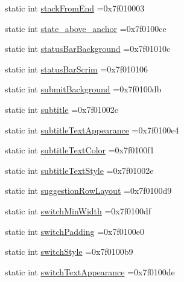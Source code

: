 \begin{DoxyCompactItemize}
static int \hyperlink{classandroid_1_1support_1_1graphics_1_1drawable_1_1R_1_1attr_a69b9d8cfb921bb4234e53faddca13058}{stack\+From\+End} =0x7f010003
\item 
static int \hyperlink{classandroid_1_1support_1_1graphics_1_1drawable_1_1R_1_1attr_af03faf6deb8ce110a4db717d7e23e2cd}{state\+\_\+above\+\_\+anchor} =0x7f0100ce
\item 
static int \hyperlink{classandroid_1_1support_1_1graphics_1_1drawable_1_1R_1_1attr_a003886c91c98b2d79fc47306239dae32}{status\+Bar\+Background} =0x7f01010c
\item 
static int \hyperlink{classandroid_1_1support_1_1graphics_1_1drawable_1_1R_1_1attr_ae9af0f0a3043093340539f6d883bf012}{status\+Bar\+Scrim} =0x7f010106
\item 
static int \hyperlink{classandroid_1_1support_1_1graphics_1_1drawable_1_1R_1_1attr_a516ee932c13db0421f20e1f2818077c0}{submit\+Background} =0x7f0100db
\item 
static int \hyperlink{classandroid_1_1support_1_1graphics_1_1drawable_1_1R_1_1attr_a24db67f2502f723666f0577dbff40bfb}{subtitle} =0x7f01002c
\item 
static int \hyperlink{classandroid_1_1support_1_1graphics_1_1drawable_1_1R_1_1attr_aaca2519d000a48ad7a1a510388e73ea3}{subtitle\+Text\+Appearance} =0x7f0100e4
\item 
static int \hyperlink{classandroid_1_1support_1_1graphics_1_1drawable_1_1R_1_1attr_a8f14fb74741e1aed62820e6a44ee49d7}{subtitle\+Text\+Color} =0x7f0100f1
\item 
static int \hyperlink{classandroid_1_1support_1_1graphics_1_1drawable_1_1R_1_1attr_af4b58eb0ee183d623b2f935f503dee78}{subtitle\+Text\+Style} =0x7f01002e
\item 
static int \hyperlink{classandroid_1_1support_1_1graphics_1_1drawable_1_1R_1_1attr_ae391b692f18e18a6593bf6019c07ee59}{suggestion\+Row\+Layout} =0x7f0100d9
\item 
static int \hyperlink{classandroid_1_1support_1_1graphics_1_1drawable_1_1R_1_1attr_a480c05bbe30584b8d6ab58bf3363d58e}{switch\+Min\+Width} =0x7f0100df
\item 
static int \hyperlink{classandroid_1_1support_1_1graphics_1_1drawable_1_1R_1_1attr_a342ce0aff1b96a978426819280297b6c}{switch\+Padding} =0x7f0100e0
\item 
static int \hyperlink{classandroid_1_1support_1_1graphics_1_1drawable_1_1R_1_1attr_a25aa2fb7ddce98d1bc5226ef73945402}{switch\+Style} =0x7f0100b9
\item 
static int \hyperlink{classandroid_1_1support_1_1graphics_1_1drawable_1_1R_1_1attr_ae4136f0b8e34a87a16645462ebdba735}{switch\+Text\+Appearance} =0x7f0100de

\end{DoxyCompactItemize}
